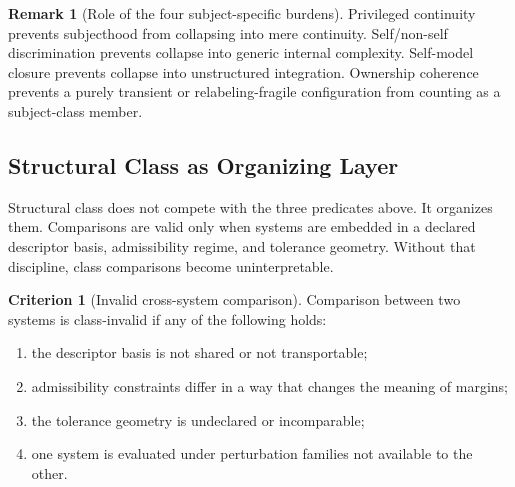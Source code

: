 \documentclass[11pt,a4paper]{article}
\theoremstyle{definition}
\newtheorem{remark}[proposition]{Remark}
\newtheorem{criterion}[proposition]{Criterion}
\begin{document}
\begin{remark}[Role of the four subject-specific burdens]
Privileged continuity prevents subjecthood from collapsing into mere continuity. Self/non-self discrimination prevents collapse into generic internal complexity. Self-model closure prevents collapse into unstructured integration. Ownership coherence prevents a purely transient or relabeling-fragile configuration from counting as a subject-class member.
\end{remark}

\subsection{Structural Class as Organizing Layer}
Structural class does not compete with the three predicates above. It organizes them. Comparisons are valid only when systems are embedded in a declared descriptor basis, admissibility regime, and tolerance geometry. Without that discipline, class comparisons become uninterpretable.

\begin{criterion}[Invalid cross-system comparison]
Comparison between two systems is class-invalid if any of the following holds:
\begin{enumerate}[leftmargin=1.5em]
\item the descriptor basis is not shared or not transportable;
\item admissibility constraints differ in a way that changes the meaning of margins;
\item the tolerance geometry is undeclared or incomparable;
\item one system is evaluated under perturbation families not available to the other.
\end{enumerate}
\end{criterion}
\end{document}
